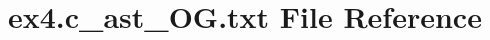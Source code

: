 \hypertarget{ex4_8c__ast__OG_8txt}{}\section{ex4.\+c\+\_\+ast\+\_\+\+O\+G.\+txt File Reference}
\label{ex4_8c__ast__OG_8txt}
